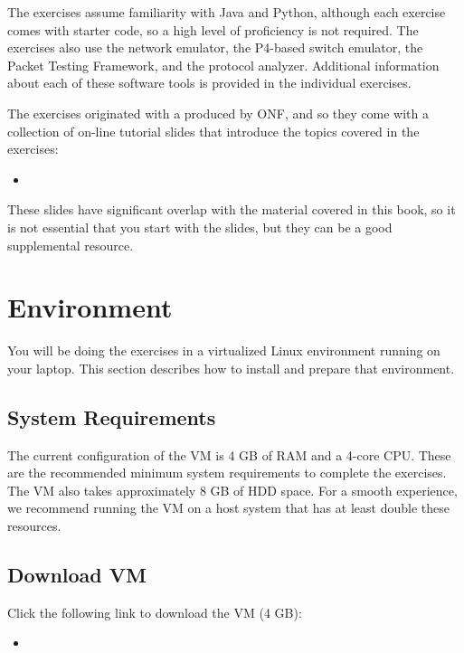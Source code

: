 \documentclass[letterpaper,11pt,english]{sphinxmanual}
\begin{document}
The exercises assume familiarity with Java and Python, although each
exercise comes with starter code, so a high level of proficiency is
not required. The exercises also use the  network emulator,
the  P4-based switch emulator, the  Packet Testing
Framework, and the  protocol analyzer. Additional
information about each of these software tools is provided in the
individual exercises.

The exercises originated with a 
produced by ONF, and so they come with a collection of on-line
tutorial slides that introduce the topics covered in the exercises:
\begin{itemize}
\item {} 

\end{itemize}

These slides have significant overlap with the material covered in
this book, so it is not essential that you start with the slides, but
they can be a good supplemental resource.


\section{Environment}
\label{\detokenize{exercises:environment}}
You will be doing the exercises in a virtualized Linux environment
running on your laptop. This section describes how to install and
prepare that environment.


\subsection{System Requirements}
\label{\detokenize{exercises:system-requirements}}
The current configuration of the VM is 4 GB of RAM and a 4-core CPU.
These are the recommended minimum system requirements to complete the
exercises. The VM also takes approximately 8 GB of HDD space. For a
smooth experience, we recommend running the VM on a host system that
has at least double these resources.


\subsection{Download VM}
\label{\detokenize{exercises:download-vm}}
Click the following link to download the VM (4 GB):
\begin{itemize}
\item {} 

\end{itemize}
\end{document}
